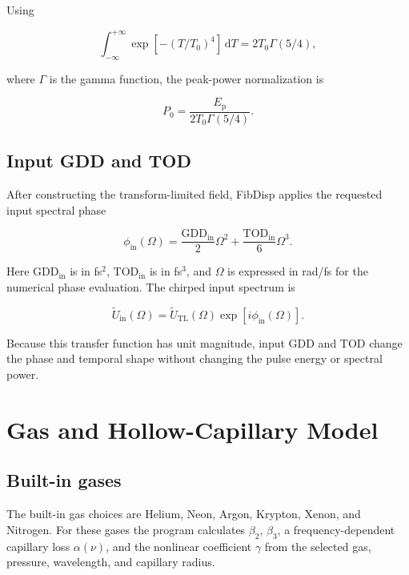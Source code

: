 \documentclass[11pt,a4paper]{article}
\newcommand{\GDD}{\mathrm{GDD}}
\newcommand{\TOD}{\mathrm{TOD}}
\newcommand{\TL}{\mathrm{TL}}
\newcommand{\dd}{\mathrm{d}}
\begin{document}
Using

\begin{equation}
\int_{-\infty}^{+\infty}
\exp[-(T/T_0)^4]\,\dd T
=2T_0\Gamma(5/4),
\end{equation}

where $\Gamma$ is the gamma function, the peak-power normalization is

\begin{equation}
\boxed{
P_0=\frac{E_{\mathrm p}}{2T_0\Gamma(5/4)}.
}
\end{equation}

\subsection{Input GDD and TOD}

After constructing the transform-limited field, FibDisp applies the requested
input spectral phase

\begin{equation}
\boxed{
\phi_{\mathrm{in}}(\Omega)
=
\frac{\GDD_{\mathrm{in}}}{2}\Omega^2
+
\frac{\TOD_{\mathrm{in}}}{6}\Omega^3.
}
\end{equation}

Here $\GDD_{\mathrm{in}}$ is in fs$^2$, $\TOD_{\mathrm{in}}$ is in fs$^3$,
and $\Omega$ is expressed in rad/fs for the numerical phase evaluation. The
chirped input spectrum is

\begin{equation}
\widetilde U_{\mathrm{in}}(\Omega)
=
\widetilde U_{\TL}(\Omega)
\exp[i\phi_{\mathrm{in}}(\Omega)].
\end{equation}

Because this transfer function has unit magnitude, input GDD and TOD change the
phase and temporal shape without changing the pulse energy or spectral power.

\section{Gas and Hollow-Capillary Model}

\subsection{Built-in gases}

The built-in gas choices are Helium, Neon, Argon, Krypton, Xenon, and Nitrogen.
For these gases the program calculates $\beta_2$, $\beta_3$, a
frequency-dependent capillary loss $\alpha(\nu)$, and the nonlinear coefficient
$\gamma$ from the selected gas, pressure, wavelength, and capillary radius.
\end{document}
